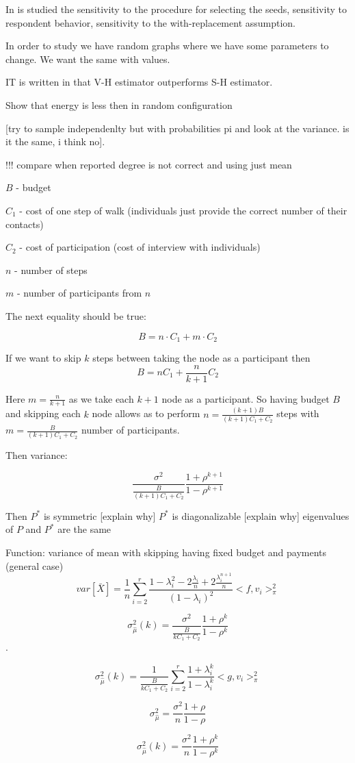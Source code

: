 \documentclass[12pt]{report}
\begin{document}
In \cite{gile2010respondent} is studied  the sensitivity to the procedure for selecting the seeds, sensitivity to respondent behavior, sensitivity to the with-replacement assumption.

In order to study we have random graphs where we have some parameters to change. We want the same with values.



IT is written in \cite{gile2010respondent} that V-H estimator outperforms S-H estimator.


Show that energy is less then in random configuration 

[try to sample independenlty but with probabilities pi and look at the variance. is it the same, i think no].



!!! compare when reported degree is not correct and using just mean


$B$ - budget

$C_1$ - cost of one step of walk (individuals just provide the correct number of their contacts)

$C_2$ - cost of participation (cost of interview with individuals)

$n$ - number of steps

$m$ - number of participants from $n$

The next equality should be true:

$$B = n \cdot C_1 + m \cdot C_2$$

If we want to skip $k$ steps between taking the node as a participant then
$$B = nC_1 + \frac{n}{k+1}C_2$$

Here $m = \frac{n}{k+1}$ as we take each $k+1$ node as a participant. So having budget $B$ and skipping each $k$ node allows as to perform $n = \frac{(k+1)B}{(k+1)C_1 + C_2}$ steps with $m = \frac{B}{(k+1)C_1 + C_2}$ number of participants.

Then variance:

$$\frac{\sigma^2}{\frac{B}{(k+1)C_1 + C_2}} \frac{1+\rho^{k+1}}{1-\rho^{k+1}}$$ 



Then 
$P^*$ is symmetric [explain why]
$P^*$ is diagonalizable [explain why]
eigenvalues of $P$ and $P^*$ are the same


Function: variance of mean with skipping having fixed budget and payments (general case)
$$ var\left[\bar{X} \right] = \frac{1}{n} \sum_{i=2}^r\frac{1-\lambda_i^2 - 2\frac{\lambda_i}{n} + 2\frac{\lambda_i^{n+1}}{n}}{(1 - \lambda_i)^2} <f, v_i>^2_{\pi}$$



$$ \sigma_{\hat{\mu}}^2(k) = \frac{\sigma^2}{\frac{B}{kC_1 + C_2}} \frac{1+\rho^{k}}{1-\rho^{k}}$$.

$$  \sigma_{\hat{\mu}}^2(k) = \frac{1}{\frac{B}{kC_1 + C_2}} \sum_{i=2}^r\frac{1 + \lambda_i^k}{1 - \lambda_i^k} <g, v_i>^2_{\pi}$$



$$\sigma_{\hat{\mu}}^2 = \frac{\sigma^2}{n} \frac{1+\rho}{1-\rho}$$

$$\sigma_{\hat{\mu}}^2(k) = \frac{\sigma^2}{n} \frac{1+\rho^k}{1-\rho^k}$$
\end{document}
